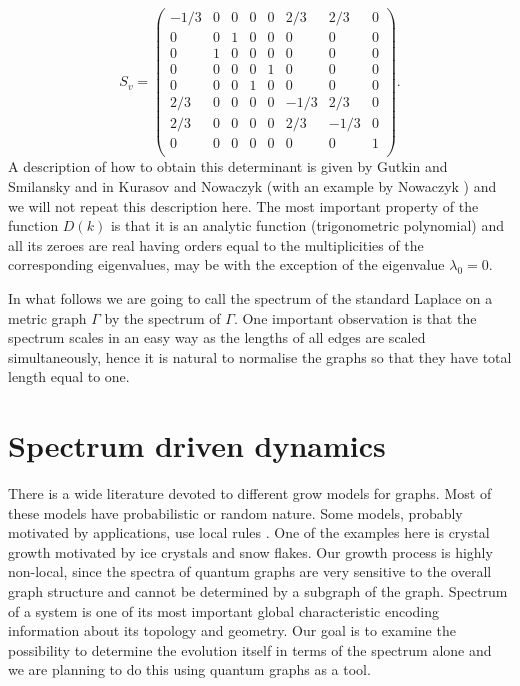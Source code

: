 \documentclass[a4paper]{article}
\begin{document}
      $$  S_v = \left(
      \begin{array}{cccccccc}
     -1/3 & 0 & 0 & 0 & 0 & 2/3 & 2/3 & 0 \\
     0 & 0 & 1 & 0 & 0 & 0 & 0 & 0 \\
     0 & 1 & 0 & 0 & 0 & 0 & 0 & 0 \\
     0 & 0 & 0 & 0 & 1 & 0 & 0 & 0 \\
     0 & 0 & 0 & 1 & 0 & 0 & 0 & 0 \\
     2/3 & 0 & 0 & 0 & 0 & -1/3 & 2/3 & 0 \\
     2/3 & 0 & 0 & 0 & 0 & 2/3 & -1/3 & 0 \\
     0 & 0 & 0 & 0 & 0 & 0 & 0 & 1 \\
\end{array} \right) .$$ 
 A description of how to obtain this determinant is given by Gutkin and Smilansky \cite{GS} and in Kurasov and Nowaczyk \cite{kurasov2005inverse} (with an example by Nowaczyk \cite{nowaczyk2005inverse}) and we will not repeat this description here. The most important property of the function $ D(k) $ is that it is an analytic function (trigonometric polynomial) and all its zeroes
 are real having orders equal to the multiplicities of the corresponding eigenvalues, may be with the exception of the eigenvalue $ \lambda_0 = 0. $
 
 In what follows we are going to call the spectrum of the standard Laplace on a metric graph $ \Gamma $ by the spectrum of $ \Gamma.$
  One important observation is that the spectrum scales in an easy way as the lengths of all edges are scaled simultaneously, hence it is natural
  to normalise the graphs so that they have total length equal to one.
 
 
 
 \section{Spectrum driven dynamics}
 
 
 There is a wide literature devoted to different grow models for graphs. Most of these models have probabilistic or random nature. Some models, probably motivated by applications,
 use local rules \cite{vazquez2003growing}. One of the examples here is crystal growth motivated by ice crystals and snow flakes. Our growth process is highly non-local, since 
 the spectra of quantum graphs are very sensitive to the overall graph structure and cannot be determined by a subgraph of the graph.
 Spectrum of a system is one of its most important global characteristic encoding information about its topology and geometry.  
 Our goal is to examine the possibility to determine the evolution itself in terms of the spectrum alone and we are planning to do this using quantum graphs
 as a tool. 
 
\end{document}
